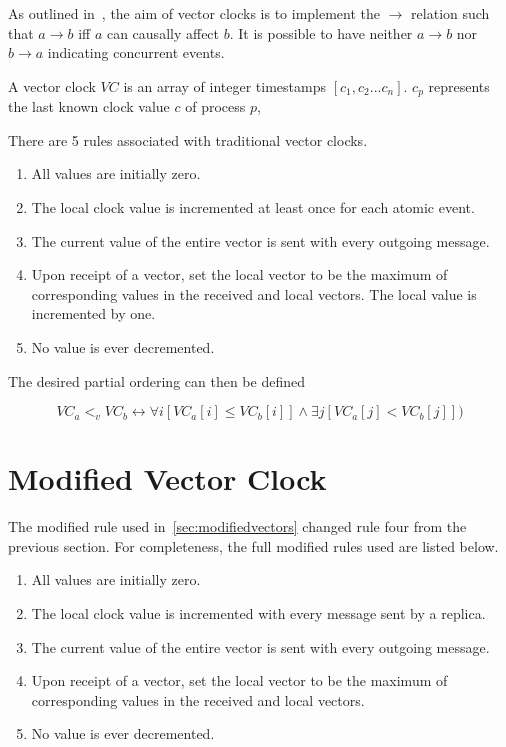 \documentclass[12pt,a4paper,twoside,openright]{report}
\begin{document}
As outlined in~\cite{fidge1987}, the aim of vector clocks is to implement the $\rightarrow$ relation such that $ a \rightarrow b$ iff $a$ can causally affect $b$. It is possible to have neither $a \rightarrow b$ nor $b \rightarrow a$ indicating concurrent events.

A vector clock $VC$ is an array of integer timestamps $[c_1, c_2...c_n]$. $c_p$ represents the last known clock value $c$ of process $p$, 

There are 5 rules associated with traditional vector clocks.
\begin{enumerate}
	\item All values are initially zero.
	\item The local clock value is incremented at least once for each atomic event.
	\item The current value of the entire vector is sent with every outgoing message.
	\item Upon receipt of a vector, set the local vector to be the maximum of corresponding values in the received and local vectors. The local value is incremented by one.
	\item No value is ever decremented.
\end{enumerate}

The desired partial ordering can then be defined

\[VC_a <_v VC_b \leftrightarrow \forall i[VC_a[i] \leq VC_b[i]] \land \exists j[VC_a[j] < VC_b[j]])\]



\section{Modified Vector Clock}
\label{appendix:modifiedvector}

The modified rule used in~\cref{sec:modifiedvectors} changed rule four from the previous section. For completeness, the full modified rules used are listed below.

\begin{enumerate}
	\item All values are initially zero.
	\item The local clock value is incremented with every message sent by a replica.
	\item The current value of the entire vector is sent with every outgoing message.
	\item Upon receipt of a vector, set the local vector to be the maximum of corresponding values in the received and local vectors.
	\item No value is ever decremented.
\end{enumerate}
\end{document}
